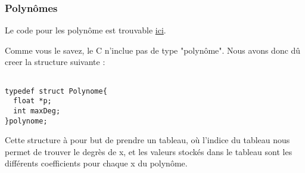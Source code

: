 \documentclass[letter]{article}
\begin{document}
\subsubsection{Polynômes}
\label{sec:orga2bcf65}

Le code pour les polynôme est trouvable \href{polynome.c}{ici}. 

Comme vous le savez, le C n'inclue pas de type "polynôme". Nous avons donc dû creer la structure suivante :

\begin{verbatim}

typedef struct Polynome{
  float *p;
  int maxDeg;
}polynome;

\end{verbatim}

Cette structure à pour but de prendre un tableau, où l'indice du tableau nous permet de trouver le degrès de x, et les valeurs stockés dans le tableau sont les différents coefficients pour chaque x du polynôme.
\end{document}
